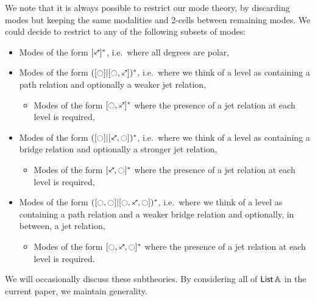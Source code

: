 \documentclass[a4paper]{article}
\begin{document}
\begin{remark}
	We note that it is always possible to restrict our mode theory, by discarding modes but keeping the same modalities and 2-cells between remaining modes.
	We could decide to restrict to any of the following subsets of modes:
	\begin{itemize}
		\item Modes of the form $[\ypolar]^*$, i.e.\ where all degrees are polar,
		\item Modes of the form $([\npolar] | [\npolar, \ypolar])^*$, i.e.\ where we think of a level as containing a path relation and optionally a weaker jet relation,
		\begin{itemize}
			\item Modes of the form $[\npolar, \ypolar]^*$ where the presence of a jet relation at each level is required,
		\end{itemize}
		\item Modes of the form $([\npolar] | [\ypolar, \npolar])^*$, i.e.\ where we think of a level as containing a bridge relation and optionally a stronger jet relation,
		\begin{itemize}
			\item Modes of the form $[\ypolar, \npolar]^*$ where the presence of a jet relation at each level is required,
		\end{itemize}
		\item Modes of the form $([\npolar, \npolar] | [\npolar, \ypolar, \npolar])^*$, i.e.\ where we think of a level as containing a path relation and a weaker bridge relation and optionally, in between, a jet relation,
		\begin{itemize}
			\item Modes of the form $[\npolar, \ypolar, \npolar]^*$ where the presence of a jet relation at each level is required.
		\end{itemize}
	\end{itemize}
	We will occasionally discuss these subtheories. By considering all of ${\mathsf{List}}\,{\mathbb{A}}$ in the current paper, we maintain generality.
\end{remark}
\end{document}
